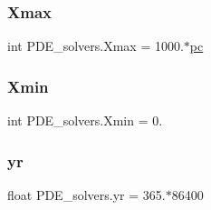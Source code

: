 \subsubsection{\texorpdfstring{Xmax}{Xmax}}
{\footnotesize\ttfamily int P\+D\+E\+\_\+solvers.\+Xmax = 1000.$\ast$\hyperlink{namespacePDE__solvers_a71c07d7118cdda8c71573599545d0017}{pc}}

\mbox{\label{namespacePDE__solvers_a7a1ac835675841b757a70f18b51246dc}} 
\subsubsection{\texorpdfstring{Xmin}{Xmin}}
{\footnotesize\ttfamily int P\+D\+E\+\_\+solvers.\+Xmin = 0.}

\mbox{\label{namespacePDE__solvers_a400304049742ae9f9b048c40cb6a52cb}} 
\subsubsection{\texorpdfstring{yr}{yr}}
{\footnotesize\ttfamily float P\+D\+E\+\_\+solvers.\+yr = 365.$\ast$86400}

